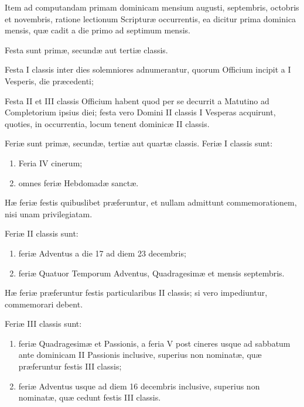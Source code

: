 \documentclass[vesperale_romanum.tex]{subfiles}
\begin{document}
Item ad computandam primam dominicam mensium augusti, septembris, octobris et novembris, ratione lectionum Scripturæ occurrentis, ea dicitur prima dominica mensis, quæ cadit a die primo ad septimum mensis.


Festa sunt primæ, secundæ aut tertiæ classis.

Festa I classis inter dies solemniores adnumerantur, quorum Officium incipit a I Vesperis, die præcedenti;

Festa II et III classis Officium habent quod per se decurrit a Matutino ad Completorium ipsius diei; festa vero Domini II classis I Vesperas acquirunt, quoties, in occurrentia, locum tenent dominicæ II classis.


Feriæ sunt primæ, secundæ, tertiæ aut quartæ classis. Feriæ I classis sunt:

\begin{enumerate}[nosep,label=\alph*.]
\item 
Feria IV cinerum;
\item omnes feriæ Hebdomadæ sanctæ.
\end{enumerate}

Hæ feriæ festis quibuslibet præferuntur, et nullam admittunt commemorationem, nisi unam privilegiatam.

Feriæ II classis sunt:
\begin{enumerate}[nosep,label=\alph*.]

\item feriæ Adventus a die 17 ad diem 23 decembris;
\item feriæ Quatuor Temporum Adventus, Quadragesimæ et mensis septembris.
\end{enumerate}

Hæ feriæ præferuntur festis particularibus II classis; si vero impediuntur, commemorari debent.

Feriæ III classis sunt:
\begin{enumerate}[nosep,label=\alph*.]
\item feriæ Quadragesimæ et Passionis, a feria V post cineres usque ad sabbatum ante dominicam II Passionis inclusive, superius non nominatæ, quæ præferuntur festis III classis;

\item feriæ Adventus usque ad diem 16 decembris inclusive, superius non nominatæ, quæ cedunt festis III classis.
\end{enumerate}
\end{document}
